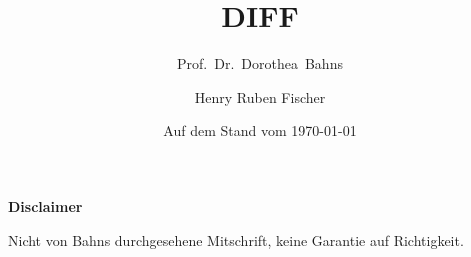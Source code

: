 \documentclass{hrflecture}
\title{DIFF \texorpdfstring{\Romannum{2}}{2}}
\subtitle{Prof.~Dr.~Dorothea~Bahns}
\date{Auf dem Stand vom \today}
\author{Henry Ruben Fischer}
\begin{document}
\maketitle

\newpage
\textbf{Disclaimer}
\vspace{1cm}

Nicht von Bahns durchgesehene Mitschrift, keine Garantie auf Richtigkeit.

\newpage
\tableofcontents
\newpage


\end{document}
